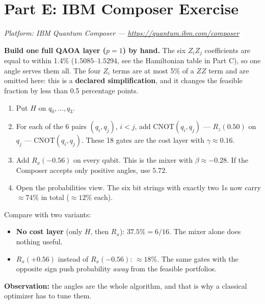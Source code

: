 \documentclass[a4paper,11pt]{article}
\begin{document}
\section{Part E: IBM Composer Exercise}

\textit{Platform: IBM Quantum Composer ---
\url{https://quantum.ibm.com/composer}}

\begin{studentbox}
\textbf{Build one full QAOA layer ($p=1$) by hand.}
The six $Z_iZ_j$ coefficients are equal to within 1.4\% ($1.5085$--$1.5294$,
see the Hamiltonian table in Part C), so one angle serves them all. The four
$Z_i$ terms are at most 5\% of a $ZZ$ term and are omitted here: this is a
\textbf{declared simplification}, and it changes the feasible fraction by less
than 0.5 percentage points.
\begin{enumerate}
    \item Put $H$ on $q_0, \dots, q_3$.
    \item For each of the 6 pairs $(q_i, q_j)$, $i < j$, add
          CNOT$(q_i, q_j)$ --- $R_z(0.50)$ on $q_j$ --- CNOT$(q_i, q_j)$.
          These 18 gates are the cost layer with $\gamma \approx 0.16$.
    \item Add $R_x(-0.56)$ on every qubit. This is the mixer with
          $\beta \approx -0.28$. If the Composer accepts only positive
          angles, use $5.72$.
    \item Open the probabilities view. The six bit strings with exactly two
          1s now carry $\approx 74\%$ in total ($\approx 12\%$ each).
\end{enumerate}
Compare with two variants:
\begin{itemize}
    \item \textbf{No cost layer} (only $H$, then $R_x$): $37.5\% = 6/16$.
          The mixer alone does nothing useful.
    \item \textbf{$R_x(+0.56)$} instead of $R_x(-0.56)$: $\approx 18\%$. The
          same gates with the opposite sign push probability \emph{away}
          from the feasible portfolios.
\end{itemize}
\textbf{Observation:} the angles are the whole algorithm, and that is why a
classical optimizer has to tune them.
\end{studentbox}
\end{document}
